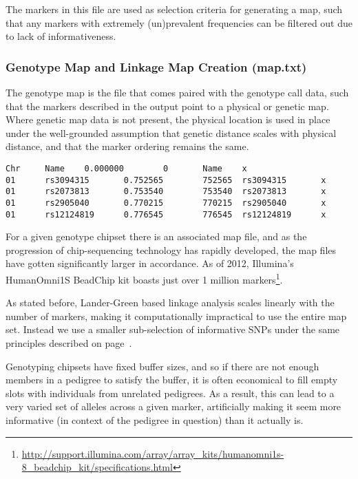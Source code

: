 The markers in this file are used as selection criteria for generating a map, such that any markers with extremely (un)prevalent frequencies can be filtered out due to lack of informativeness.

\subsubsection{Genotype Map and Linkage Map Creation (map.txt)}

The genotype map is the file that comes paired with the genotype call data, such that the markers described in the output point to a physical or genetic map. Where genetic map data is not present, the physical location is used in place under the well-grounded assumption that genetic distance scales with physical distance, and that the marker ordering remains the same.

\begingroup
\vspace{10pt}
\begin{lstlisting}
Chr     Name    0.000000        0       Name    x
01      rs3094315       0.752565        752565  rs3094315       x
01      rs2073813       0.753540        753540  rs2073813       x
01      rs2905040       0.770215        770215  rs2905040       x
01      rs12124819      0.776545        776545  rs12124819      x
\end{lstlisting}
\vspace{-10pt}
\endgroup

For a given genotype chipset there is an associated map file, and as the progression of chip-sequencing technology has rapidly developed, the map files have gotten significantly larger in accordance. As of 2012, Illumina's HumanOmni1S BeadChip kit boasts just over 1 million markers\footnote{\tiny\url{http://support.illumina.com/array/array_kits/humanomni1s-8_beadchip_kit/specifications.html}}.

As stated before, Lander-Green based linkage analysis scales linearly with the number of markers, making it computationally impractical to use the entire map set. Instead we use a smaller sub-selection of informative SNPs under the same principles described on page~\pageref{informativemarkers}.

Genotyping chipsets have fixed buffer sizes, and so if there are not enough members in a pedigree to satisfy the buffer, it is often economical to fill empty slots with individuals from unrelated pedigrees. As a result, this can lead to a very varied set of alleles across a given marker, artificially making it seem more informative (in context of the pedigree in question) than it actually is. 

